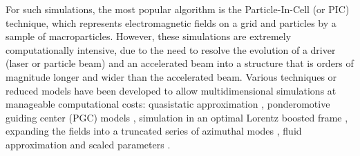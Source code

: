 For such simulations,
the most popular algorithm is the Particle-In-Cell (or PIC) technique,
which represents electromagnetic fields on a grid and particles by
a sample of macroparticles.
However, these simulations are extremely computationally intensive, due to the need to resolve the evolution of a driver (laser or particle beam) and an accelerated beam into a structure that is orders of magnitude longer and wider than the accelerated beam.
Various techniques or reduced models have been developed to allow multidimensional simulations at manageable computational costs: quasistatic approximation \cite{Sprangleprl90,Antonsenprl1992,Krallpre1993,Morapop1997,Quickpic},
ponderomotive guiding center (PGC) models \cite{Antonsenprl1992,Krallpre1993,Quickpic,Benedettiaac2010,Cowanjcp11}, simulation in an optimal Lorentz boosted frame \cite{Vayprl07,Bruhwileraac08,Vayscidac09,Vaypac09,Martinspac09,VayAAC2010,Martinsnaturephysics10,Martinspop10, Martinscpc10, Vayjcp2011,VayPOPL2011,Vaypop2011,Yu2016},
expanding the fields into a truncated series of azimuthal modes
\cite{godfrey1985iprop,LifschitzJCP2009,DavidsonJCP2015,Lehe2016,AndriyashPoP2016}, fluid approximation \cite{Krallpre1993,Shadwickpop09,Benedettiaac2010} and scaled parameters \cite{Cormieraac08,Geddespac09}.
